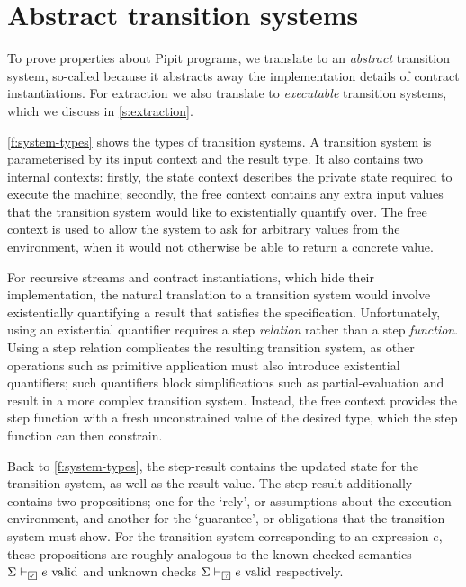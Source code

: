 
\section{Abstract transition systems}
\label{s:transition}


To prove properties about Pipit programs, we translate to an \emph{abstract} transition system, so-called because it abstracts away the implementation details of contract instantiations.
For extraction we also translate to \emph{executable} transition systems, which we discuss in \autoref{s:extraction}.

\autoref{f:system-types} shows the types of transition systems.
A transition system is parameterised by its input context and the result type.
It also contains two internal contexts: firstly, the state context describes the private state required to execute the machine; secondly, the free context contains any extra input values that the transition system would like to existentially quantify over.
The free context is used to allow the system to ask for arbitrary values from the environment, when it would not otherwise be able to return a concrete value.

For recursive streams and contract instantiations, which hide their implementation, the natural translation to a transition system would involve existentially quantifying a result that satisfies the specification.
Unfortunately, using an existential quantifier requires a step \emph{relation} rather than a step \emph{function}.
Using a step relation complicates the resulting transition system, as other operations such as primitive application must also introduce existential quantifiers; such quantifiers block simplifications such as partial-evaluation and result in a more complex transition system.
Instead, the free context provides the step function with a fresh unconstrained value of the desired type, which the step function can then constrain.

Back to \autoref{f:system-types}, the step-result contains the updated state for the transition system, as well as the result value.
The step-result additionally contains two propositions; one for the `rely', or assumptions about the execution environment, and another for the `guarantee', or obligations that the transition system must show.
For the transition system corresponding to an expression $e$, these propositions are roughly analogous to the known checked semantics $\semcheck{\Sigma}{\PSValid}{e}$ and unknown checks $\semcheck{\Sigma}{\PSUnknown}{e}$ respectively.

